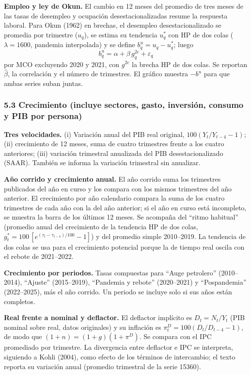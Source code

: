 \textbf{Empleo y ley de Okun.} El cambio en 12 meses del promedio de
tres meses de las tasas de desempleo y ocupación desestacionalizadas
resume la respuesta laboral. Para Okun (1962) en brechas, el desempleo
desestacionalizado se promedia por trimestre (\(u_q\)), se estima su
tendencia \(u^*_q\) con HP de dos colas (\(\lambda=1600\), pandemia
interpolada) y se define \(b^u_q=u_q-u^*_q\); luego
\[b^u_q = \alpha+\beta\, g^{2c}_q+\varepsilon_q\] por MCO excluyendo
2020 y 2021, con \(g^{2c}\) la brecha HP de dos colas. Se reportan
\(\hat\beta\), la correlación y el número de trimestres. El gráfico
muestra \(-b^u\) para que ambas series suban juntas.

\hypertarget{crecimiento-incluye-sectores-gasto-inversiuxf3n-consumo-y-pib-por-persona}{%
\subsubsection{5.3 Crecimiento (incluye sectores, gasto, inversión,
consumo y PIB por
persona)}\label{crecimiento-incluye-sectores-gasto-inversiuxf3n-consumo-y-pib-por-persona}}

\textbf{Tres velocidades.} (i) Variación anual del PIB real original,
\(100(Y_t/Y_{t-4}-1)\); (ii) crecimiento de 12 meses, suma de cuatro
trimestres frente a los cuatro anteriores; (iii) variación trimestral
anualizada del PIB desestacionalizado (SAAR). También se informa la
variación trimestral sin anualizar.

\textbf{Año corrido y crecimiento anual.} El año corrido suma los
trimestres publicados del año en curso y los compara con los mismos
trimestres del año anterior. El crecimiento por año calendario compara
la suma de los cuatro trimestres de cada año con la del año anterior; si
el año en curso está incompleto, se muestra la barra de los últimos 12
meses. Se acompaña del ``ritmo habitual'' (promedio anual del
crecimiento de la tendencia HP de dos colas,
\(g^*_t=100\,[e^{(\tau_t-\tau_{t-4})/100}-1]\)) y del promedio simple
2010--2019. La tendencia de dos colas se usa para el crecimiento
potencial porque la de tiempo real oscila con el rebote de 2021--2022.

\textbf{Crecimiento por periodos.} Tasas compuestas para ``Auge
petrolero'' (2010--2014), ``Ajuste'' (2015--2019), ``Pandemia y rebote''
(2020--2021) y ``Pospandemia'' (2022--2025), más el año corrido. Un
periodo se incluye solo si sus años están completos.

\textbf{Real frente a nominal y deflactor.} El deflactor implícito es
\(D_t = N_t/Y_t\) (PIB nominal sobre real, datos originales) y su
inflación es \(\pi^D_t=100(D_t/D_{t-4}-1)\), de modo que
\((1+n)=(1+g)(1+\pi^D)\). Se compara con el IPC promediado por
trimestre. La divergencia entre deflactor e IPC se interpreta, siguiendo
a Kohli (2004), como efecto de los términos de intercambio; el texto
reporta su variación anual (promedio trimestral de la serie 15360).

